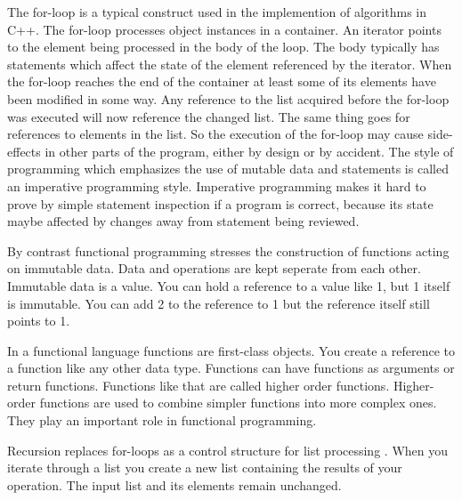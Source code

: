 \documentclass[12pt,fleqn]{article}
\begin{document}
The for-loop is a typical construct used in the implemention of algorithms in C++.
The for-loop  processes object instances in a container.
An iterator points to the element being processed in the body of the loop.
The body typically has statements which affect the state of the element referenced by the iterator.
When the for-loop reaches the end of the container at least some of its elements have been modified in some way.
Any reference to the list acquired before the for-loop was executed will now reference the changed list.
The same thing goes for references to elements in the list.
So the execution of the for-loop may cause side-effects in other parts of the program, either by design or by accident.
The style of programming which emphasizes the use of mutable data and statements is called an imperative programming style.
Imperative programming makes it hard to prove by simple statement inspection if a program is correct, because its state maybe affected by changes away from statement being reviewed.

By contrast functional programming stresses the construction of functions acting on immutable data.
Data and operations are kept seperate from each other.
Immutable data is a value. 
You can hold a reference to a value like 1, but 1 itself is immutable.
You can add 2 to the reference to 1 but the reference itself still points to 1.

In a functional language functions are first-class objects. 
You create a reference to a function like any other data type.
Functions can have functions as arguments or return functions.
Functions like that are called higher order functions.
Higher-order functions are used to combine simpler functions into more complex ones.
They play an important role in functional programming.

Recursion replaces for-loops as a control structure for list processing \cite{hutton, bird}.
When you iterate through a list you create a new list containing the results of your operation.
The input list and its elements remain unchanged.
\end{document}
